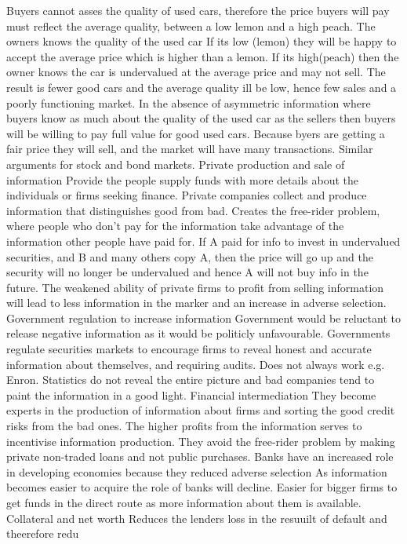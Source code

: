 \documentclass[12pt]{examnotes}
\begin{document}
\ra Buyers cannot asses the quality of used cars, therefore the price buyers will pay must reflect the average quality, between a low lemon and a high peach.
\ra The owners knows the quality of the used car
 If its low (lemon) they will be happy to accept the average price which is higher than a lemon. 
 If its high(peach) then the owner knows the car is undervalued at the average price and may not sell. 
\ra The result is fewer good cars and the average quality ill be low, hence few sales and a poorly functioning market.
\ra In the absence of asymmetric information where buyers know as much about the quality of the used car as the sellers then buyers will be willing to pay full value for good used cars.
\ra Because byers are getting a fair price they will sell, and the market will have many transactions.
\ra Similar arguments for stock and bond markets.
\vspace{6pt}
 Private production and sale of information
\rna Provide the people supply funds with more details  about the individuals or firms seeking finance.
\rna Private companies collect and produce information that distinguishes good from bad.
\rna Creates the free-rider problem, where people who don't pay for the information take advantage of the information other people have paid for.
\rna If A paid for info to invest in undervalued securities, and B and many others copy A, then the price will go up and the security will no longer be undervalued and hence A will not buy info in the future.
\rna The weakened ability of private firms to profit from selling information will lead to less information in the marker and an increase in adverse selection.
 Government regulation to increase information
\rna Government would be reluctant to release negative information as it would be politicly unfavourable.
\rna Governments regulate securities markets to encourage firms to reveal honest and accurate information about themselves, and requiring audits. 
\rna Does not always work e.g. Enron. Statistics do not reveal the entire picture and bad companies tend to paint the information in a good light.
 Financial intermediation
\rna They become experts in the production of information about firms and sorting the good credit risks from the bad ones.
\rna The higher profits from the information serves to incentivise information production.
\rna They avoid the free-rider problem by making private non-traded loans and not public purchases.
\rna Banks have an increased role in developing economies because they reduced adverse selection
\rna As information becomes easier to acquire the role of banks will decline.
\rna Easier for bigger firms to get funds in the direct route as more information about them is available.
 Collateral and net worth
\rna Reduces the lenders loss in the resuuilt of default and theerefore redu
\rna 
\rna 
\end{document}
